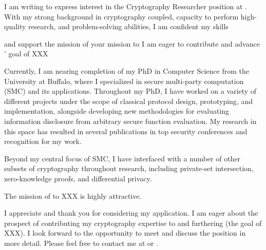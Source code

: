 
I am writing to express interest in the Cryptography Researcher position at \company. With my strong background in cryptography coupled, capacity to perform high-quality research, and problem-solving abilities, I am confident my skills

and support 
the mission of \company
your mission to 
I am eager to contribute
and advance
\company' goal of XXX

Currently, I am nearing completion of my PhD in Computer Science from the University at Buffalo, where I specialized in secure multi-party computation (SMC) and its applications. Throughout my PhD, I have worked on a variety of different projects under the scope of classical protocol design, prototyping, and implementation, alongside developing new methodologies for evaluating information disclosure from arbitrary secure function evaluation.
My research in this space has resulted in several publications in top security conferences and recognition 
for my work.

Beyond my central focus of SMC, I have interfaced with a number of other subsets of cryptography throughout research, including private-set intersection, zero-knowledge proofs, and differential privacy.

The mission of \company to XXX is highly attractive. 


I appreciate and thank you for considering my application. I am eager about the prospect of contributing my cryptography expertise to \company and furthering (the goal of XXX).
I look forward to the opportunity to meet and discuss the position in more detail. Please feel free to contact me at \myphone or \myemail. 
